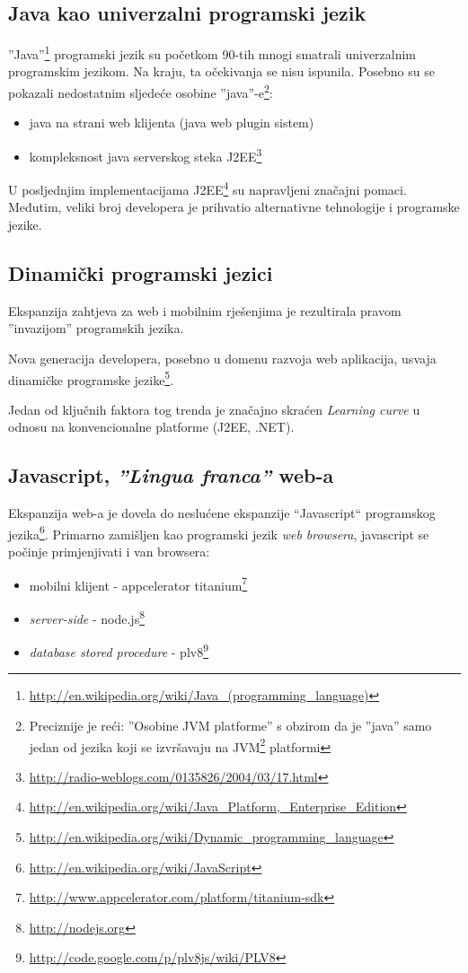 \documentclass[times, utf8, seminar]{fit}
\begin{document}
\subsection{Java kao univerzalni programski jezik}

''Java''\footnote{\url{http://en.wikipedia.org/wiki/Java_(programming_language)}} programski jezik su početkom 90-tih mnogi smatrali univerzalnim programskim jezikom. Na kraju, ta očekivanja se nisu ispunila. Posebno su se pokazali nedostatnim sljedeće osobine ''java''-e\footnote{Preciznije je reći: ''Osobine JVM platforme'' s obzirom da je ''java'' samo jedan od jezika koji se izvršavaju na JVM\footnote{\url{http://en.wikipedia.org/wiki/Java_virtual_machine}} platformi}: 
\begin{itemize}
  \item java na strani web klijenta (java web plugin sistem)
  \item kompleksnost java serverskog steka J2EE\footnote{\url{http://radio-weblogs.com/0135826/2004/03/17.html}} 
\end{itemize}

U posljednjim implementacijama J2EE\footnote{\url{http://en.wikipedia.org/wiki/Java_Platform,_Enterprise_Edition}} su napravljeni značajni pomaci. Međutim, veliki broj developera je prihvatio alternativne tehnologije i programske jezike.

\subsection{Dinamički programski jezici}

Ekspanzija zahtjeva za web i mobilnim rješenjima je rezultirala pravom ''invazijom'' programskih jezika. 

Nova generacija developera, posebno u domenu razvoja web aplikacija, usvaja dinamičke programske jezike\footnote{\url{http://en.wikipedia.org/wiki/Dynamic_programming_language}}. 
 
Jedan od ključnih faktora tog trenda je značajno skraćen \emph{Learning curve} u odnosu na konvencionalne platforme (J2EE, .NET).

\subsection{Javascript, \emph{''Lingua franca''} web-a}

Ekspanzija web-a je dovela do neslućene ekspanzije ``Javascript`` programskog jezika\footnote{\url{http://en.wikipedia.org/wiki/JavaScript}}. Primarno zamišljen kao programski jezik \emph{web browsera}, javascript se počinje primjenjivati i van browsera:
\begin{itemize}
  \item mobilni klijent - appcelerator titanium\footnote{\url{http://www.appcelerator.com/platform/titanium-sdk}}
  \item \emph{server-side} - node.js\footnote{\url{http://nodejs.org}}
  \item \emph{database stored procedure} - plv8\footnote{\url{http://code.google.com/p/plv8js/wiki/PLV8}}
\end{itemize}
 
\end{document}
